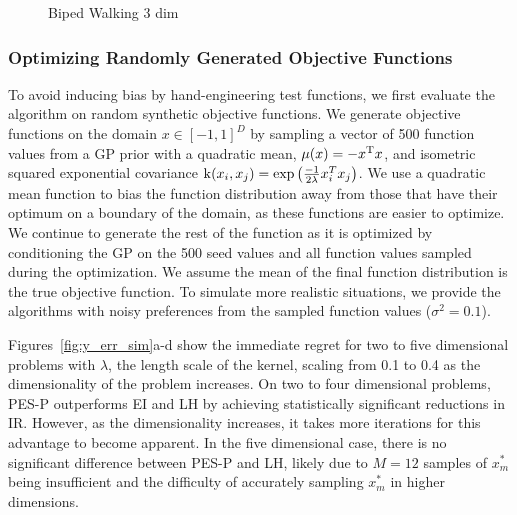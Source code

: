 \begin{figure*}[t!]
\begin{subfigure}[b]{0.24\textwidth}
        \vspace{-20pt}\caption{Biped Walking 3 dim}\label{fig:Neuro_3}
    \end{subfigure}
    \caption{Performance of predictive entropy search with preferences (PES-P),
    expected improvement (EI), and Latin hypercube random sampling (LH) for
    optimizing random objective functions sampled from a GP (a-d), and tuning
    feedback control parameters of random linear systems (e-f) and a biped
    walking model (g-h). Shown are the median and interquartile range over 20
    trials of the immediate regret (IR) against the number of preference
    queries. Black stars indicate iterations for which PES-P achieves
    statistically significant stochastic reductions in IR compared to both EI
    and LH according to one-sided Mann-Whitney $U$ tests $(p <
    0.05)$.}\label{fig:y_err_sim}
\end{figure*}

\subsubsection{Optimizing Randomly Generated Objective Functions}

To avoid inducing bias by hand-engineering test functions, we first evaluate the
algorithm on random synthetic objective functions. We generate objective
functions on the domain $x \in {[-1, 1]}^D$ by sampling a vector of 500 function
values from a GP prior with a quadratic mean, $\mu(x) = - x^{\mathrm{T}} x$, and
isometric squared exponential covariance $\funcil{k}{x_i,x_j} = \exp
\left(\frac{-1}{2 \lambda} x_i^T x_j \right)$. We use a quadratic mean function
to bias the function distribution away from those that have their optimum on a
boundary of the domain, as these functions are easier to optimize. We continue
to generate the rest of the function as it is optimized by conditioning the GP
on the 500 seed values and all function values sampled during the optimization.
We assume the mean of the final function distribution is the true objective
function. To simulate more realistic situations, we provide the algorithms with
noisy preferences from the sampled function values ($\sigma^2 = 0.1$).

Figures~\ref{fig:y_err_sim}a-d show the immediate regret for two to five
dimensional problems with $\lambda$, the length scale of the kernel, scaling
from 0.1 to 0.4 as the dimensionality of the problem increases. On two to four
dimensional problems, PES-P outperforms EI and LH by achieving statistically
significant reductions in IR\@. However, as the dimensionality increases, it
takes more iterations for this advantage to become apparent. In the five
dimensional case, there is no significant difference between PES-P and LH,
likely due to $M=12$ samples of $x_m^*$ being insufficient and the difficulty of
accurately sampling $x_m^*$ in higher dimensions.


